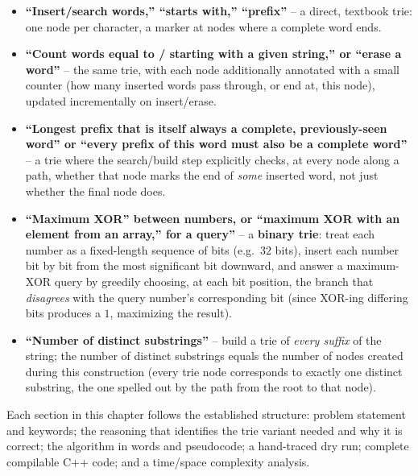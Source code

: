 \begin{patternbox}
\begin{itemize}
  \item \textbf{``Insert/search words,'' ``starts with,'' ``prefix''} --
        a direct, textbook trie: one node per character, a marker at
        nodes where a complete word ends.
  \item \textbf{``Count words equal to / starting with a given
        string,'' or ``erase a word''} -- the same trie, with each node
        additionally annotated with a small counter (how many inserted
        words pass through, or end at, this node), updated incrementally
        on insert/erase.
  \item \textbf{``Longest prefix that is itself always a complete,
        previously-seen word'' or ``every prefix of this word must also
        be a complete word''} -- a trie where the search/build step
        explicitly checks, at every node along a path, whether that node
        marks the end of \emph{some} inserted word, not just whether the
        final node does.
  \item \textbf{``Maximum XOR'' between numbers, or ``maximum XOR with
        an element from an array,'' for a query''} -- a \textbf{binary
        trie}: treat each number as a fixed-length sequence of bits
        (e.g.\ $32$ bits), insert each number bit by bit from the most
        significant bit downward, and answer a maximum-XOR query by
        greedily choosing, at each bit position, the branch that
        \emph{disagrees} with the query number's corresponding bit
        (since XOR-ing differing bits produces a $1$, maximizing the
        result).
  \item \textbf{``Number of distinct substrings''} -- build a trie of
        \emph{every suffix} of the string; the number of distinct
        substrings equals the number of nodes created during this
        construction (every trie node corresponds to exactly one
        distinct substring, the one spelled out by the path from the
        root to that node).
\end{itemize}
\end{patternbox}

Each section in this chapter follows the established structure: problem
statement and keywords; the reasoning that identifies the trie variant
needed and why it is correct; the algorithm in words and pseudocode; a
hand-traced dry run; complete compilable C++ code; and a time/space
complexity analysis.

\newpage







